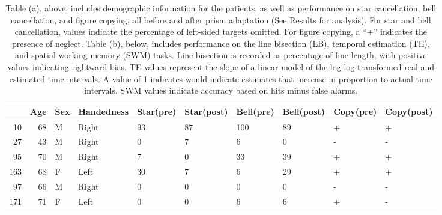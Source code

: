\begin{sidewaystable}[p]
\centering
\begin{tabular}{rrllllllll}
  \hline
 & Age & Sex & Handedness & Star(pre) & Star(post) & Bell(pre) & Bell(post) & Copy(pre) & Copy(post) \\ 
  \hline
10 &  68 & M & Right & 93 & 87 & 100 & 89 & + & + \\ 
  27 &  43 & M & Right & 0 & 7 & 6 & 0 & - & - \\ 
  95 &  70 & M & Right & 7 & 0 & 33 & 39 & + & + \\ 
  163 &  68 & F & Left & 30 & 7 & 6 & 29 & + & + \\ 
  97 &  66 & M & Right & 0 & 0 & 0 & 0 & - & - \\ 
  171 &  71 & F & Left & 0 & 0 & 6 & 6 & + & - \\ 
   \hline
\end{tabular}
\caption{Table (a), above, includes demographic information for the
	patients, as well as performance on star cancellation, bell
	cancellation, and figure copying, all before and after prism adaptation
	(See Results for analysis). For star and bell cancellation, values
	indicate the percentage of left-sided targets omitted. For figure
	copying, a ``+'' indicates the presence of neglect. Table (b), below,
	includes performance on the line bisection (LB), temporal estimation
	(TE), and spatial working memory (SWM) tasks. Line bisection is recorded
	as percentage of line length, with positive values indicating rightward
	bias. TE values represent the slope of a linear model of the log-log
	transformed real and estimated time intervals. A value of 1 indicates
	would indicate estimates that increase in proportion to actual time
	intervals. SWM values indicate accuracy based on hits minus false
alarms.}
\label{tbl_Prisms}

\end{sidewaystable}
